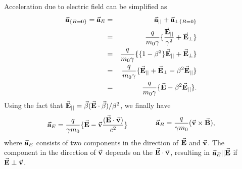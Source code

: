 \documentclass{article}
\begin{document}
Acceleration due to electric field can be simplified as
\vspace{-10pt}
\begin{eqnarray*}
    \vec{\textbf{a}}_{\{B=0\}} = \vec{\textbf{a}}_{E}   &=&  \vec{\textbf{a}}_{||} + \vec{\textbf{a}}_{\perp \{B=0\}} \\
                                &=& \frac{q}{m_0 \gamma} \{ \frac{\vec{\textbf{E}}_{||}}{\gamma^2} + \vec{\textbf{E}}_{\perp} \} \\
                                &=& \frac{q}{m_0 \gamma} \{ \{1 - \beta^2\}\vec{\textbf{E}}_{||} + \vec{\textbf{E}}_{\perp} \} \\
                                &=& \frac{q}{m_0 \gamma} \{ \vec{\textbf{E}}_{||} + \vec{\textbf{E}}_{\perp}-\beta^2\vec{\textbf{E}}_{||} \} \\
                                &=& \frac{q}{m_0 \gamma} \{ \vec{\textbf{E}} - \beta^2\vec{\textbf{E}}_{||} \} .
\end{eqnarray*}
\vspace{-10pt}
Using the fact that $\vec{\textbf{E}}_{||} = \vec{\beta}(\vec{\textbf{E}} \cdot \vec{\beta})/\beta^2 $, we finally have
\begin{equation} \label{eq:acc_of_E_and_B}
    \begin{aligned}
        \vec{\textbf{a}}_{E} = \frac{q}{ \gamma m_0} \{ \vec{\textbf{E}} - \vec{\textbf{v}}\frac{(\vec{\textbf{E}} \cdot \vec{\textbf{v}})}{c^2} \}
    \end{aligned}
    \qquad \qquad
    \begin{aligned}
        \vec{\textbf{a}}_{B} = \frac{q}{\gamma m_0} ( \vec{\textbf{v}} \times \vec{\textbf{B}} ) ,
    \end{aligned}
\end{equation}
where $\vec{\textbf{a}}_{E}$ consists of two components in the direction of $\vec{\textbf{E}}$ and $\vec{\textbf{v}}$.
The component in the direction of $\vec{\textbf{v}}$ depends on the $\vec{\textbf{E}} \cdot \vec{\textbf{v}}$, 
resulting in $\vec{\textbf{a}}_{E} || \vec{\textbf{E}}$ if $\vec{\textbf{E}} \perp \vec{\textbf{v}}$.
\end{document}
